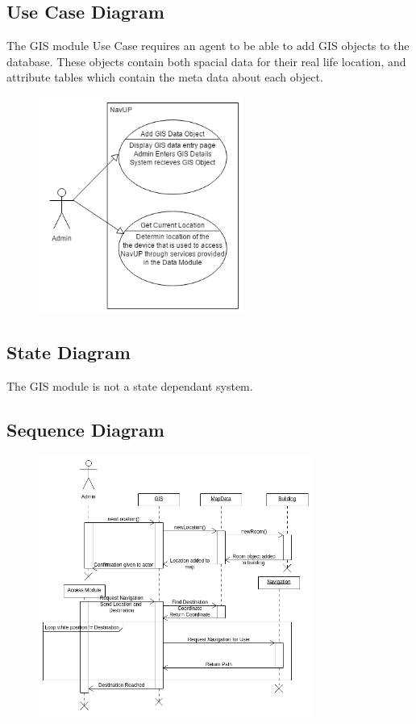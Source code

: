 \subsection{Use Case Diagram}

The GIS module Use Case requires an agent to be able to add GIS objects to the database. These objects contain both spacial data for their real life location, and attribute tables which contain the meta data about each object. \\
\begin{figure}[!htbp]
  \includegraphics[width=0.6\textwidth]{GIS/GIS_Use_case.png}
\end{figure}

\subsection{State Diagram}
The GIS module is not a state dependant system.

\subsection{Sequence Diagram}
\begin{figure}[!htbp]
	\includegraphics[width=0.8\textwidth]{GIS/GIS_Sequence_Diagram.png}
\end{figure}

